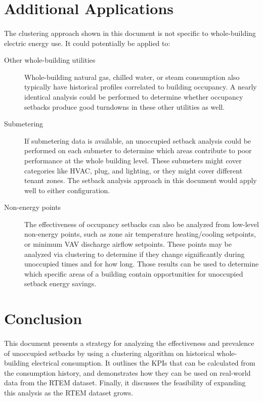 \documentclass[a4paper]{article}
\begin{document}
\section{Additional Applications}

\paragraph{}
The clustering approach shown in this document is not specific to whole-building electric energy use. It could potentially be applied to:
\begin{description}
\item[Other whole-building utilities]{Whole-building natural gas, chilled water, or steam consumption also typically have historical profiles correlated to building occupancy. A nearly identical analysis could be performed to determine whether occupancy setbacks produce good turndowns in these other utilities as well.}
\item[Submetering]{If submetering data is available, an unoccupied setback analysis could be performed on each submeter to determine which areas contribute to poor performance at the whole building level. These submeters might cover categories like HVAC, plug, and lighting, or they might cover different tenant zones. The setback analysis approach in this document would apply well to either configuration.}
\item[Non-energy points]{The effectiveness of occupancy setbacks can also be analyzed from low-level non-energy points, such as zone air temperature heating/cooling setpoints, or minimum VAV discharge airflow setpoints. These points may be analyzed via clustering to determine if they change significantly during unoccupied times and for how long. Those results can be used to determine which specific areas of a building contain opportunities for unoccupied setback energy savings.}
\end{description}

\section{Conclusion}

\paragraph{}
This document presents a strategy for analyzing the effectiveness and prevalence of unoccupied setbacks by using a clustering algorithm on historical whole-building electrical consumption. It outlines the KPIs that can be calculated from the consumption history, and demonstrates how they can be used on real-world data from the RTEM dataset. Finally, it discusses the feasibility of expanding this analysis as the RTEM dataset grows.
\end{document}
